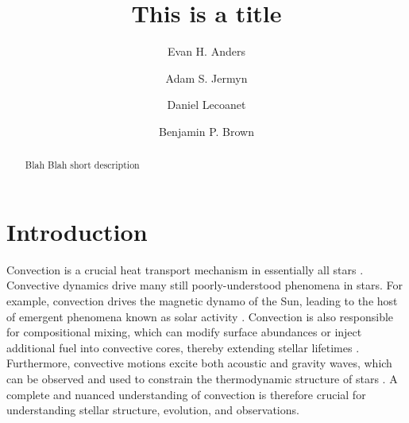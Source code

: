 \documentclass{aastex631}
\begin{document}
\title{This is a title}
\author[0000-0002-3433-4733]{Evan H. Anders}
\author[0000-0001-5048-9973]{Adam S. Jermyn}
\author[0000-0002-7635-9728]{Daniel Lecoanet}
\author[0000-0001-8935-219X]{Benjamin P. Brown}


\begin{abstract}
Blah Blah short description
\end{abstract}



\section{Introduction}
\label{sec:introduction}
Convection is a crucial heat transport mechanism in essentially all stars \citep{woosley_etal_2002, hansen_etal_2004, christensen-dalsgaard_2021}.
Convective dynamics drive many still poorly-understood phenomena in stars.
For example, convection drives the magnetic dynamo of the Sun, leading to the host of emergent phenomena known as solar activity \citep{brun_browning_2017}.
Convection is also responsible for compositional mixing, which can modify surface abundances or inject additional fuel into convective cores, thereby extending stellar lifetimes \citep{salaris_cassisi_2017}.
Furthermore, convective motions excite both acoustic and gravity waves, which can be observed and used to constrain the thermodynamic structure of stars \citep{aerts2010, basu2016}.
A complete and nuanced understanding of convection is therefore crucial for understanding stellar structure, evolution, and observations.
\end{document}
